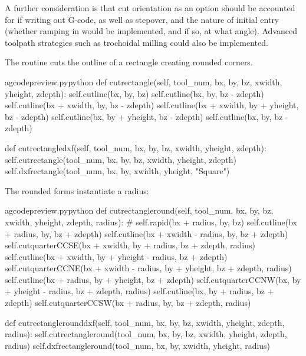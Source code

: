 \documentclass{ltxdoc}
\begin{document}
A further consideration is that cut orientation as an option should be accounted for if writing out G-code, as well as stepover, and the nature of initial entry (whether ramping in would be implemented, and if so, at what angle). Advanced toolpath strategies such as trochoidal milling could also be implemented.

The routine  cuts the outline of a rectangle creating rounded corners.

\lstset{firstnumber=\thegcpy}
\begin{writecode}{a}{gcodepreview.py}{python}
    def cutrectangle(self, tool_num, bx, by, bz, xwidth, yheight, zdepth):
        self.cutline(bx, by, bz)
        self.cutline(bx, by, bz - zdepth)
        self.cutline(bx + xwidth, by, bz - zdepth)
        self.cutline(bx + xwidth, by + yheight, bz - zdepth)
        self.cutline(bx, by + yheight, bz - zdepth)
        self.cutline(bx, by, bz - zdepth)

    def cutrectangledxf(self, tool_num, bx, by, bz, xwidth, yheight, zdepth):
        self.cutrectangle(tool_num, bx, by, bz, xwidth, yheight, zdepth)
        self.dxfrectangle(tool_num, bx, by, xwidth, yheight, "Square")

\end{writecode}
\addtocounter{gcpy}{15}

The rounded forms instantiate a radius:

\lstset{firstnumber=\thegcpy}
\begin{writecode}{a}{gcodepreview.py}{python}
    def cutrectangleround(self, tool_num, bx, by, bz, xwidth, yheight, zdepth, radius):
#        self.rapid(bx + radius, by, bz)
        self.cutline(bx + radius, by, bz + zdepth)
        self.cutline(bx + xwidth - radius, by, bz + zdepth)
        self.cutquarterCCSE(bx + xwidth, by + radius, bz + zdepth, radius) 
        self.cutline(bx + xwidth, by + yheight - radius, bz + zdepth)
        self.cutquarterCCNE(bx + xwidth - radius, by + yheight, bz + zdepth, radius) 
        self.cutline(bx + radius, by + yheight, bz + zdepth)
        self.cutquarterCCNW(bx, by + yheight - radius, bz + zdepth, radius) 
        self.cutline(bx, by + radius, bz + zdepth)
        self.cutquarterCCSW(bx + radius, by, bz + zdepth, radius) 

    def cutrectanglerounddxf(self, tool_num, bx, by, bz, xwidth, yheight, zdepth, radius):
        self.cutrectangleround(tool_num, bx, by, bz, xwidth, yheight, zdepth, radius)
        self.dxfrectangleround(tool_num, bx, by, xwidth, yheight, radius)

\end{writecode}
\addtocounter{gcpy}{15}
\end{document}
